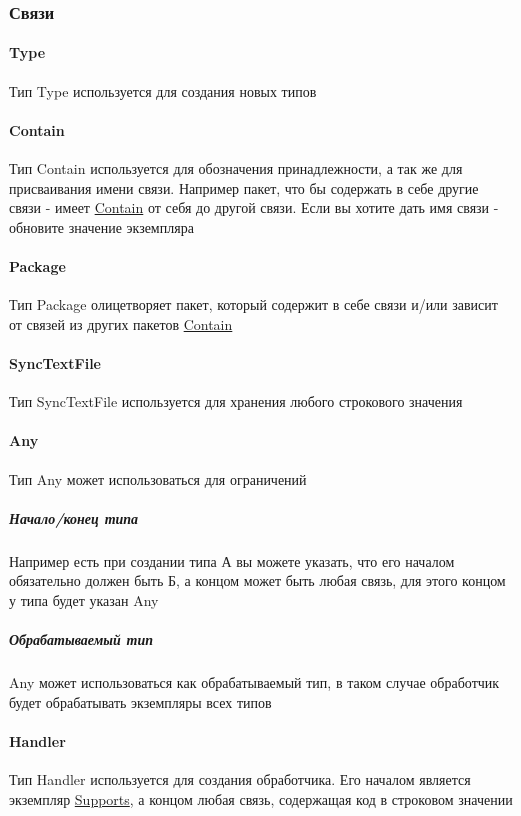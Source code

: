 \documentclass{article}
\begin{document}
\subsubsection{Связи}
\paragraph*{Type}\hypertarget{Core.Type.Description}{}
Тип Type используется для создания новых типов
\paragraph*{Contain}\hypertarget{Core.Contain.Description}{}
Тип Contain используется для обозначения
принадлежности, а так же для присваивания имени связи. Например пакет, что бы
содержать в себе другие связи - имеет
\hyperlink{Core.Contain.Description}{Contain} от себя
до другой связи. Если вы хотите дать имя связи - обновите значение экземпляра
\paragraph*{Package}\hypertarget{Core.Package.Description}{}
Тип Package олицетворяет пакет, который содержит в себе связи и/или зависит от
связей из других пакетов
\hyperlink{Core.Contain.Description}{Contain}
\paragraph*{SyncTextFile}\hypertarget{Core.SyncTextFile.Description}{}
Тип SyncTextFile используется для хранения
любого строкового значения
\paragraph*{Any}\hypertarget{Core.Any.Description}{}
Тип Any может использоваться для ограничений
\subparagraph*{Начало/конец типа}
Например есть при создании типа А вы можете указать, что его началом
обязательно должен быть Б, а концом может быть любая связь, для этого концом у
типа будет указан Any
\subparagraph*{Обрабатываемый тип}
Any может использоваться как обрабатываемый тип, в таком случае обработчик
будет обрабатывать экземпляры всех типов
\paragraph*{Handler}\hypertarget{Core.Handler.Description}{}
Тип Handler используется для создания обработчика.
Его началом является экземпляр \hyperlink{supports.Description}{Supports}, а
концом
любая связь, содержащая код в строковом значении
\end{document}
